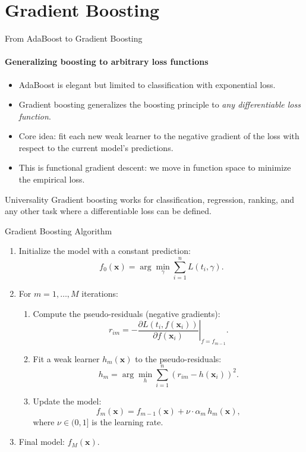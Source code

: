 \section{Gradient Boosting}

\begin{frame}{From AdaBoost to Gradient Boosting}
  \framesubtitle{Generalizing boosting to arbitrary loss functions}
  \begin{itemize}
    \item AdaBoost is elegant but limited to classification with exponential loss.
    \item \alert{Gradient boosting} generalizes the boosting principle to \emph{any differentiable
          loss function}.
    \item Core idea: fit each new weak learner to the \alert{negative gradient} of the loss
          with respect to the current model's predictions.
    \item This is \alert{functional gradient descent}: we move in function space to minimize
          the empirical loss.
  \end{itemize}
  \begin{block}{Universality}
    Gradient boosting works for classification, regression, ranking, and any other task where
    a differentiable loss can be defined.
  \end{block}
\end{frame}

\begin{frame}{Gradient Boosting Algorithm}
  \begin{enumerate}
    \item Initialize the model with a constant prediction:
          \[
          f_0(\mathbf{x}) = \arg\min_{\gamma} \sum_{i=1}^{n} L(t_i, \gamma).
          \]
    \item For $m = 1, \ldots, M$ iterations:
      \begin{enumerate}
        \item Compute the \alert{pseudo-residuals} (negative gradients):
              \[
              r_{im} = -\left.\frac{\partial L(t_i, f(\mathbf{x}_i))}{\partial f(\mathbf{x}_i)}\right|_{f = f_{m-1}}.
              \]
        \item Fit a weak learner $h_m(\mathbf{x})$ to the pseudo-residuals:
              \[
              h_m = \arg\min_h \sum_{i=1}^{n} (r_{im} - h(\mathbf{x}_i))^2.
              \]
        \item Update the model:
              \[
              f_m(\mathbf{x}) = f_{m-1}(\mathbf{x}) + \nu \cdot \alpha_m\, h_m(\mathbf{x}),
              \]
              where $\nu \in (0, 1]$ is the learning rate.
      \end{enumerate}
    \item Final model: $f_M(\mathbf{x})$.
  \end{enumerate}
\end{frame}

